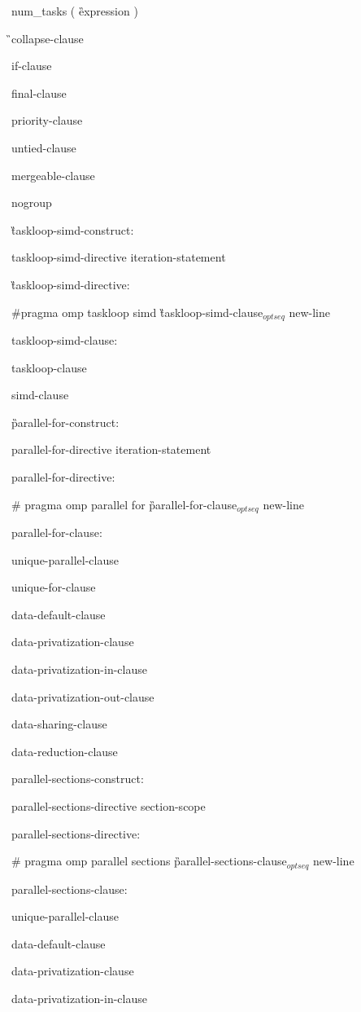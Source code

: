 {\I num\_tasks ( \G expression \C )

\G\I collapse-clause

\I if-clause

\I final-clause

\I priority-clause

\I untied-clause

\I mergeable-clause

\C\I nogroup

\G taskloop-simd-construct:

\I taskloop-simd-directive iteration-statement

\G taskloop-simd-directive:

\C\I \#pragma omp taskloop simd \G taskloop-simd-clause$_{optseq}$ new-line

taskloop-simd-clause:

\I taskloop-clause

\I simd-clause

\G parallel-for-construct:

\I parallel-for-directive iteration-statement

parallel-for-directive:

\C\I \# pragma omp parallel for \G parallel-for-clause$_{optseq}$ new-line

parallel-for-clause:

\I unique-parallel-clause

\I unique-for-clause

\I data-default-clause 

\I data-privatization-clause 

\I data-privatization-in-clause

\I data-privatization-out-clause 

\I data-sharing-clause 

\I data-reduction-clause 

parallel-sections-construct:

\I parallel-sections-directive section-scope

 parallel-sections-directive:

\C\I \# pragma omp parallel sections \G parallel-sections-clause$_{optseq}$ new-line

parallel-sections-clause:

\I unique-parallel-clause

\I data-default-clause 

\I data-privatization-clause 

\I data-privatization-in-clause

}
